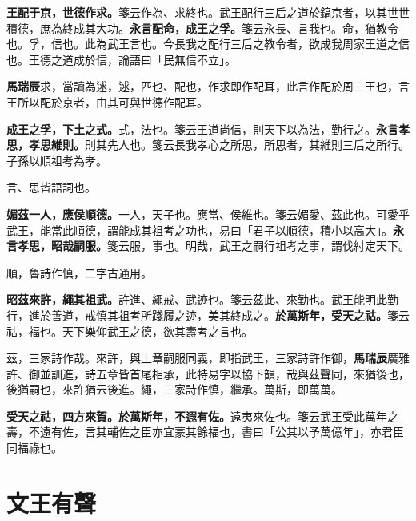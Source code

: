 \textbf{王配于京，世德作求。}{\footnotesize 箋云作為、求終也。武王配行三后之道於鎬京者，以其世世積德，庶為終成其大功。}\textbf{永言配命，成王之孚。}{\footnotesize 箋云永長、言我也。命，猶教令也。孚，信也。此為武王言也。今長我之配行三后之教令者，欲成我周家王道之信也。王德之道成於信，論語曰「民無信不立」。}

\begin{quoting}\textbf{馬瑞辰}求，當讀為逑，逑，匹也、配也，作求即作配耳，此言作配於周三王也，言王所以配於京者，由其可與世德作配耳。\end{quoting}

\textbf{成王之孚，下土之式。}{\footnotesize 式，法也。箋云王道尚信，則天下以為法，勤行之。}\textbf{永言孝思，孝思維則。}{\footnotesize 則其先人也。箋云長我孝心之所思，所思者，其維則三后之所行。子孫以順祖考為孝。}

\begin{quoting}言、思皆語詞也。\end{quoting}

\textbf{媚茲一人，應侯順德。}{\footnotesize 一人，天子也。應當、侯維也。箋云媚愛、茲此也。可愛乎武王，能當此順德，謂能成其祖考之功也，易曰「君子以順德，積小以高大」。}\textbf{永言孝思，昭哉嗣服。}{\footnotesize 箋云服，事也。明哉，武王之嗣行祖考之事，謂伐紂定天下。}

\begin{quoting}順，魯詩作慎，二字古通用。\end{quoting}

\textbf{昭茲來許，繩其祖武。}{\footnotesize 許進、繩戒、武迹也。箋云茲此、來勤也。武王能明此勤行，進於善道，戒慎其祖考所踐履之迹，美其終成之。}\textbf{於萬斯年，受天之祜。}{\footnotesize 箋云祜，福也。天下樂仰武王之德，欲其壽考之言也。}

\begin{quoting}茲，三家詩作哉。來許，與上章嗣服同義，即指武王，三家詩許作御，\textbf{馬瑞辰}廣雅許、御並訓進，詩五章皆首尾相承，此特易字以協下韻，哉與茲聲同，來猶後也，後猶嗣也，來許猶云後進。繩，三家詩作慎，繼承。萬斯，即萬萬。\end{quoting}

\textbf{受天之祜，四方來賀。於萬斯年，不遐有佐。}{\footnotesize 遠夷來佐也。箋云武王受此萬年之壽，不遠有佐，言其輔佐之臣亦宜蒙其餘福也，書曰「公其以予萬億年」，亦君臣同福祿也。}

\section{文王有聲}


